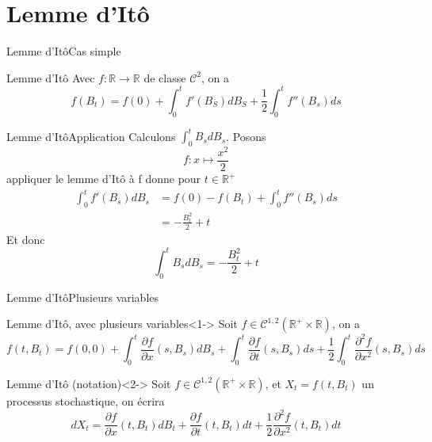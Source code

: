 \documentclass{beamer}
\newcommand{\1}{\mathmybb{1}}
\begin{document}
 \section{Lemme d'Itô}
   \begin{frame}{Lemme d'Itô}{Cas simple}
     \begin{block}{Lemme d'Itô}
       Avec $f: \mathbb{R} \rightarrow \mathbb{R} $ de classe $\mathcal{C}^{2} $, on a
       \begin{equation}
         f(B_{t}) = f(0) + \int_{0}^{t}f'(B_{S})dB_{S} + \frac{1}{2}\int_{0}^{t} f''(B_{s})ds
       \end{equation}
     \end{block}
     \end{frame}
     \begin{frame}{Lemme d'Itô}{Application}
       Calculons $ \int_{0}^{t} B_{s}dB_{s}$.
       \pause
       Posons
       \[
         f: x \mapsto \frac{x^{2}}{2}
       \]
       \pause
       appliquer le lemme d'Itô à f donne pour $ t \in \mathbb{R}^{+}$
       \begin{align}
         \int_{0}^{t}f'(B_{s})dB_{s} &= f(0) - f(B_{t}) + \int_{0}^{t} f''(B_{s}) ds \\
         &= - \frac{B_{t}^{2}}{2} + t
       \end{align}
       \pause
       Et donc
       \[
         \int_{0}^{t}B_{s}dB_{s} = - \frac{B_{t}^{2}}{2} + t
       \]
     \end{frame}
     \begin{frame}{Lemme d'Itô}{Plusieurs variables}
     \begin{block}{Lemme d'Itô, avec plusieurs variables}<1->
       Soit $f\in \mathcal{C}^{1, 2}(\mathbb{R}^{+} \times \mathbb{R})$, on a
       \begin{equation}
           f(t, B_{t}) = f(0, 0) + \int_{0}^{t}\frac{\partial f}{\partial x}(s, B_{s}) dB_{s} + \int_{0}^{t}\frac{\partial f}{\partial t}(s, B_{s}) ds + \frac{1}{2} \int_{0}^{t}\frac{\partial ^{2} f}{\partial x^{2}}(s, B_{s}) ds
         \end{equation}
         \end{block}
       \begin{block}{Lemme d'Itô (notation)}<2->
         Soit $f\in \mathcal{C}^{1, 2}(\mathbb{R}^{+} \times \mathbb{R})$, et $ X_{t} = f(t, B_{t})$ un processus stochastique, on écrira
         \begin{equation}
           dX_{t} = \frac{\partial f}{\partial x}(t, B_{t}) dB_{t} + \frac{\partial f}{\partial t}(t, B_{t}) dt + \frac{1}{2} \frac{\partial^{2}f}{\partial x^{2}}(t, B_{t}) dt
         \end{equation}
       \end{block}
     \end{frame}
\end{document}
